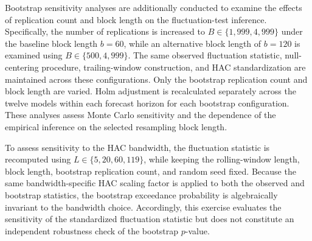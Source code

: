 \documentclass[runningheads,orivec]{llncs}
\begin{document}
Bootstrap sensitivity analyses are additionally conducted to examine the effects of replication count and block length on the fluctuation-test inference. Specifically, the number of replications is increased to $B\in\{1,999,4,999\}$ under the baseline block length $b=60$, while an alternative block length of $b=120$ is examined using $B\in\{500,4,999\}$. The same observed fluctuation statistic, null-centering procedure, trailing-window construction, and HAC standardization are maintained across these configurations. Only the bootstrap replication count and block length are varied. Holm adjustment is recalculated separately across the twelve models within each forecast horizon for each bootstrap configuration. These analyses assess Monte Carlo sensitivity and the dependence of the empirical inference on the selected resampling block length.

To assess sensitivity to the HAC bandwidth, the fluctuation statistic is recomputed using $L\in\{5,20,60,119\}$, while keeping the rolling-window length, block length, bootstrap replication count, and random seed fixed. Because the same bandwidth-specific HAC scaling factor is applied to both the observed and bootstrap statistics, the bootstrap exceedance probability is algebraically invariant to the bandwidth choice. Accordingly, this exercise evaluates the sensitivity of the standardized fluctuation statistic but does not constitute an independent robustness check of the bootstrap $p$-value.
\end{document}
